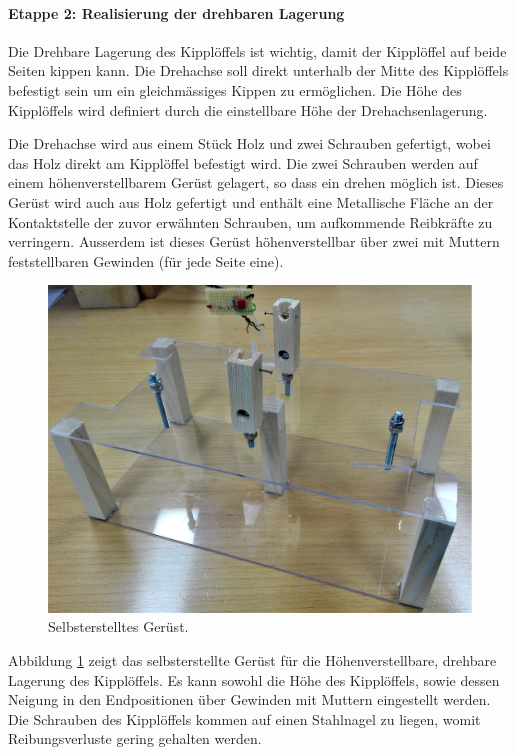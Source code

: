 \paragraph{Etappe 2: Realisierung der drehbaren Lagerung}
Die Drehbare Lagerung des Kipplöffels ist wichtig, damit der Kipplöffel auf beide Seiten kippen kann. Die Drehachse soll direkt unterhalb der Mitte des Kipplöffels befestigt sein um ein gleichmässiges Kippen zu ermöglichen. Die Höhe des Kipplöffels wird definiert durch die einstellbare Höhe der Drehachsenlagerung. 

Die Drehachse wird aus einem Stück Holz und zwei Schrauben gefertigt, wobei das Holz direkt am Kipplöffel befestigt wird. Die zwei Schrauben werden auf einem höhenverstellbarem Gerüst gelagert, so dass ein drehen möglich ist. Dieses Gerüst wird auch aus Holz gefertigt und enthält eine Metallische Fläche an der Kontaktstelle der zuvor erwähnten Schrauben, um aufkommende Reibkräfte zu verringern. Ausserdem ist dieses Gerüst höhenverstellbar über zwei mit Muttern feststellbaren Gewinden (für jede Seite eine). 

\begin{figure}[h]
\centering
\includegraphics[width=0.8\linewidth]{graphics/Etappe2.jpg}
\caption{Selbsterstelltes Gerüst.}
\label{fig:Etappe2}
\end{figure}

Abbildung \ref{fig:Etappe2} zeigt das selbsterstellte Gerüst für die Höhenverstellbare, drehbare Lagerung des Kipplöffels. Es kann sowohl die Höhe des Kipplöffels, sowie dessen Neigung in den Endpositionen über Gewinden mit Muttern eingestellt werden. Die Schrauben des Kipplöffels kommen auf einen Stahlnagel zu liegen, womit Reibungsverluste gering gehalten werden.

